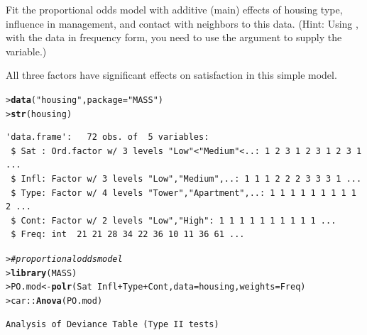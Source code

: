 \documentclass[10pt]{report}\usepackage[]{graphicx}\usepackage[]{color}
\makeatletter
\newcommand{\hlstr}[1]{\textcolor[rgb]{0.192,0.494,0.8}{#1}}%
\newcommand{\hlcom}[1]{\textcolor[rgb]{0.678,0.584,0.686}{\textit{#1}}}%
\newcommand{\hlopt}[1]{\textcolor[rgb]{0,0,0}{#1}}%
\newcommand{\hlstd}[1]{\textcolor[rgb]{0.345,0.345,0.345}{#1}}%
\newcommand{\hlkwb}[1]{\textcolor[rgb]{0.69,0.353,0.396}{#1}}%
\newcommand{\hlkwc}[1]{\textcolor[rgb]{0.333,0.667,0.333}{#1}}%
\newcommand{\hlkwd}[1]{\textcolor[rgb]{0.737,0.353,0.396}{\textbf{#1}}}%
\newenvironment{kframe}{%
 \def\at@end@of@kframe{}%
 \ifinner\ifhmode%
  \def\at@end@of@kframe{\end{minipage}}%
  \begin{minipage}{\columnwidth}%
 \fi\fi%
 \def\FrameCommand##1{\hskip\@totalleftmargin \hskip-\fboxsep
 \colorbox{shadecolor}{##1}\hskip-\fboxsep
     \hskip-\linewidth \hskip-\@totalleftmargin \hskip\columnwidth}%
 \MakeFramed {\advance\hsize-\width
   \@totalleftmargin\z@ \linewidth\hsize
   \@setminipage}}%
 {\par\unskip\endMakeFramed%
 \at@end@of@kframe}
\newenvironment{knitrout}{}{} %
\renewenvironment{knitrout}{\small\renewcommand{\baselinestretch}{.85}}{} %
\makeatother
\begin{document}
\begin{Exercises}
\begin{enumerate*}
    \item Fit the proportional odds model with additive (main) effects of housing type,
    influence in management, and contact with neighbors to this data.
    (Hint: Using , with the data in frequency form, you need to use the
     argument to supply the  variable.)
    \begin{ans}
    All three factors have significant effects on satisfaction in this simple model.
\begin{knitrout}\footnotesize
{}\color{fgcolor}\begin{kframe}
\begin{alltt}
\hlstd{> }\hlkwd{data}\hlstd{(}\hlstr{"housing"}\hlstd{,} \hlkwc{package}\hlstd{=}\hlstr{"MASS"}\hlstd{)}
\hlstd{> }\hlkwd{str}\hlstd{(housing)}
\end{alltt}
\begin{verbatim}
'data.frame':	72 obs. of  5 variables:
 $ Sat : Ord.factor w/ 3 levels "Low"<"Medium"<..: 1 2 3 1 2 3 1 2 3 1 ...
 $ Infl: Factor w/ 3 levels "Low","Medium",..: 1 1 1 2 2 2 3 3 3 1 ...
 $ Type: Factor w/ 4 levels "Tower","Apartment",..: 1 1 1 1 1 1 1 1 1 2 ...
 $ Cont: Factor w/ 2 levels "Low","High": 1 1 1 1 1 1 1 1 1 1 ...
 $ Freq: int  21 21 28 34 22 36 10 11 36 61 ...
\end{verbatim}
\begin{alltt}
\hlstd{> }\hlcom{# proportional odds model }
\hlstd{> }\hlkwd{library}\hlstd{(MASS)}
\hlstd{> }\hlstd{PO.mod} \hlkwb{<-} \hlkwd{polr}\hlstd{(Sat} \hlopt{~} \hlstd{Infl} \hlopt{+} \hlstd{Type} \hlopt{+} \hlstd{Cont,} \hlkwc{data}\hlstd{=housing,} \hlkwc{weights}\hlstd{=Freq)}
\hlstd{> }\hlstd{car}\hlopt{::}\hlkwd{Anova}\hlstd{(PO.mod)}
\end{alltt}
\begin{verbatim}
Analysis of Deviance Table (Type II tests)


\end{verbatim}
\end{kframe}
\end{knitrout}
\end{ans}
\end{enumerate*}
\end{Exercises}
\end{document}
